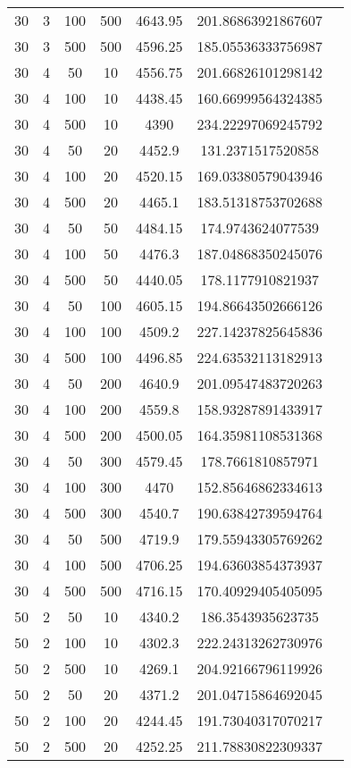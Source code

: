 {\begin{longtabu}{S
S
S
S
S
S[round-mode=places,round-precision=0]
S[round-mode=places,round-precision=0]}
30 & 3 & 100 & 500 & 4643.95 & 201.86863921867607 \\
30 & 3 & 500 & 500 & 4596.25 & 185.05536333756987 \\
30 & 4 & 50 & 10 & 4556.75 & 201.66826101298142 \\
30 & 4 & 100 & 10 & 4438.45 & 160.66999564324385 \\
30 & 4 & 500 & 10 & 4390 & 234.22297069245792 \\
30 & 4 & 50 & 20 & 4452.9 & 131.2371517520858 \\
30 & 4 & 100 & 20 & 4520.15 & 169.03380579043946 \\
30 & 4 & 500 & 20 & 4465.1 & 183.51318753702688 \\
30 & 4 & 50 & 50 & 4484.15 & 174.9743624077539 \\
30 & 4 & 100 & 50 & 4476.3 & 187.04868350245076 \\
30 & 4 & 500 & 50 & 4440.05 & 178.1177910821937 \\
30 & 4 & 50 & 100 & 4605.15 & 194.86643502666126 \\
30 & 4 & 100 & 100 & 4509.2 & 227.14237825645836 \\
30 & 4 & 500 & 100 & 4496.85 & 224.63532113182913 \\
30 & 4 & 50 & 200 & 4640.9 & 201.09547483720263 \\
30 & 4 & 100 & 200 & 4559.8 & 158.93287891433917 \\
30 & 4 & 500 & 200 & 4500.05 & 164.35981108531368 \\
30 & 4 & 50 & 300 & 4579.45 & 178.7661810857971 \\
30 & 4 & 100 & 300 & 4470 & 152.85646862334613 \\
30 & 4 & 500 & 300 & 4540.7 & 190.63842739594764 \\
30 & 4 & 50 & 500 & 4719.9 & 179.55943305769262 \\
30 & 4 & 100 & 500 & 4706.25 & 194.63603854373937 \\
30 & 4 & 500 & 500 & 4716.15 & 170.40929405405095 \\
50 & 2 & 50 & 10 & 4340.2 & 186.3543935623735 \\
50 & 2 & 100 & 10 & 4302.3 & 222.24313262730976 \\
50 & 2 & 500 & 10 & 4269.1 & 204.92166796119926 \\
50 & 2 & 50 & 20 & 4371.2 & 201.04715864692045 \\
50 & 2 & 100 & 20 & 4244.45 & 191.73040317070217 \\
50 & 2 & 500 & 20 & 4252.25 & 211.78830822309337 \\

\end{longtabu}}
